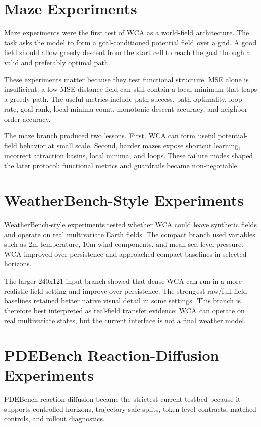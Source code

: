 \documentclass[11pt]{article}
\begin{document}
\section{Maze Experiments}

Maze experiments were the first test of WCA as a world-field architecture. The
task asks the model to form a goal-conditioned potential field over a grid. A
good field should allow greedy descent from the start cell to reach the goal
through a valid and preferably optimal path.

These experiments matter because they test functional structure. MSE alone is
insufficient: a low-MSE distance field can still contain a local minimum that
traps a greedy path. The useful metrics include path success, path optimality,
loop rate, goal rank, local-minima count, monotonic descent accuracy, and
neighbor-order accuracy.

The maze branch produced two lessons. First, WCA can form useful potential-field
behavior at small scale. Second, harder mazes expose shortcut learning,
incorrect attraction basins, local minima, and loops. These failure modes shaped
the later protocol: functional metrics and guardrails became non-negotiable.

\section{WeatherBench-Style Experiments}

WeatherBench-style experiments tested whether WCA could leave synthetic fields
and operate on real multivariate Earth fields. The compact branch used variables
such as 2m temperature, 10m wind components, and mean sea-level pressure. WCA
improved over persistence and approached compact baselines in selected horizons.

The larger 240x121-input branch showed that dense WCA can run in a more
realistic field setting and improve over persistence. The strongest raw/full
field baselines retained better native visual detail in some settings. This
branch is therefore best interpreted as real-field transfer evidence: WCA can
operate on real multivariate states, but the current interface is not a final
weather model.

\section{PDEBench Reaction-Diffusion Experiments}

PDEBench reaction-diffusion became the strictest current testbed because it
supports controlled horizons, trajectory-safe splits, token-level contracts,
matched controls, and rollout diagnostics.
\end{document}
